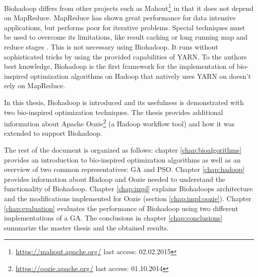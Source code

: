 Biohadoop differs from other projects such as Mahout\footnote{\url{https://mahout.apache.org/} last access: 02.02.2015} in that it does not depend on MapReduce. MapReduce has shown great performance for data intensive applications, but performs poor for iterative problems. Special techniques must be used to overcome its limitations, like result caching \cite{bu2010haloop} or long running map and reduce stages \cite{ekanayake2010twister}. This is not necessary using Biohadoop. It runs without sophisticated tricks by using the provided capabilities of YARN. To the authors best knowledge, Biohadoop is the first framework for the implementation of bio-inspired optimization algorithms on Hadoop that natively uses YARN on doesn't rely on MapReduce.

In this thesis, Biohadoop is introduced and its usefulness is demonstrated with two bio-inspired optimization techniques. The thesis provides additional information about Apache Oozie\footnote{\url{https://oozie.apache.org/} last access: 01.10.2014} (a Hadoop workflow tool) and how it was extended to support Biohadoop.


The rest of the document is organized as follows: chapter \ref{chap:bioalgorithms} provides an introduction to bio-inspired optimization algorithms as well as an overview of two common representatives: GA and PSO. Chapter \ref{chap:hadoop} provides information about Hadoop and Oozie needed to understand the functionality of Biohadoop. Chapter \ref{chap:impl} explains Biohadoops architecture and the modifications implemented for Oozie (section \ref{chap:impl:oozie}). Chapter \ref{chap:evaluation} evaluates the performance of Biohadoop using two different implementations of a GA. The conclusions in chapter \ref{chap:conclusions} summarize the master thesis and the obtained results.